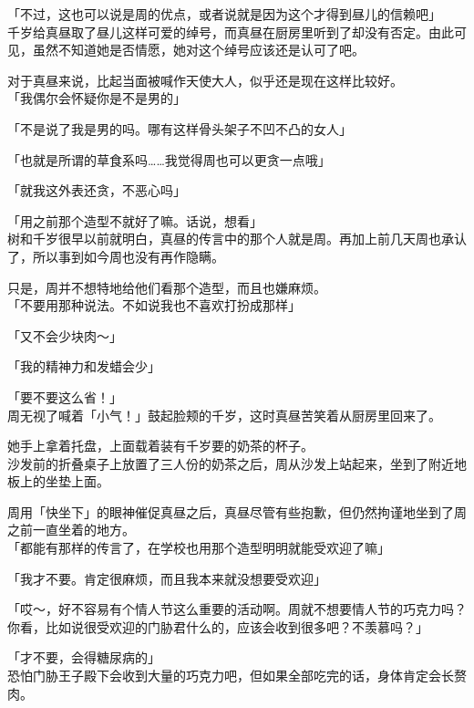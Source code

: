 「不过，这也可以说是周的优点，或者说就是因为这个才得到昼儿的信赖吧」\\

千岁给真昼取了昼儿这样可爱的绰号，而真昼在厨房里听到了却没有否定。由此可见，虽然不知道她是否情愿，她对这个绰号应该还是认可了吧。

对于真昼来说，比起当面被喊作天使大人，似乎还是现在这样比较好。\\

「我偶尔会怀疑你是不是男的」

「不是说了我是男的吗。哪有这样骨头架子不凹不凸的女人」

「也就是所谓的草食系吗……我觉得周也可以更贪一点哦」

「就我这外表还贪，不恶心吗」

「用之前那个造型不就好了嘛。话说，想看」\\

树和千岁很早以前就明白，真昼的传言中的那个人就是周。再加上前几天周也承认了，所以事到如今周也没有再作隐瞒。

只是，周并不想特地给他们看那个造型，而且也嫌麻烦。\\

「不要用那种说法。不如说我也不喜欢打扮成那样」

「又不会少块肉～」

「我的精神力和发蜡会少」

「要不要这么省！」\\

周无视了喊着「小气！」鼓起脸颊的千岁，这时真昼苦笑着从厨房里回来了。

她手上拿着托盘，上面载着装有千岁要的奶茶的杯子。\\

沙发前的折叠桌子上放置了三人份的奶茶之后，周从沙发上站起来，坐到了附近地板上的坐垫上面。

周用「快坐下」的眼神催促真昼之后，真昼尽管有些抱歉，但仍然拘谨地坐到了周之前一直坐着的地方。\\

「都能有那样的传言了，在学校也用那个造型明明就能受欢迎了嘛」

「我才不要。肯定很麻烦，而且我本来就没想要受欢迎」

「哎～，好不容易有个情人节这么重要的活动啊。周就不想要情人节的巧克力吗？你看，比如说很受欢迎的门胁君什么的，应该会收到很多吧？不羡慕吗？」

「才不要，会得糖尿病的」\\

恐怕门胁王子殿下会收到大量的巧克力吧，但如果全部吃完的话，身体肯定会长赘肉。\\

